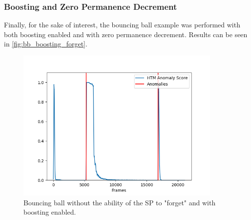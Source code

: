 \subsubsection{Boosting and Zero Permanence Decrement}
Finally, for the sake of interest, the bouncing ball example was performed with both boosting enabled and with zero permanence decrement. Results can be seen in \autoref{fig:bb_boosting_forget}.
\begin{figure}[H]
    \centering
    \includegraphics[width=0.9\textwidth]{resources/experiments/bouncing_ball/bb_anoms_unforgetting_boosting.png}
    \caption[Bouncing Ball Experiment Anomaly Score No Boosting Zero Decrement]{Bouncing ball without the ability of the SP to "forget" and with boosting enabled.}
    \label{fig:bb_boosting_forget}
\end{figure}
